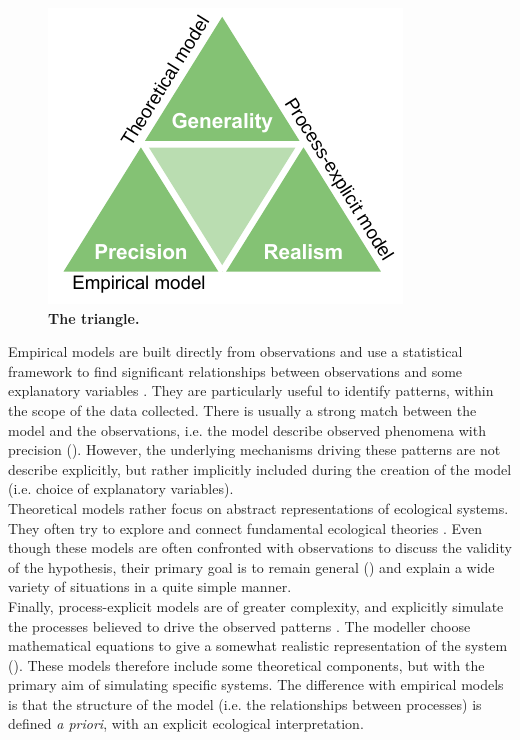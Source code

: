 \clearpage

\begin{figure}[ht]
\centering
\includegraphics{0introduction/figs/levins_triangle.pdf}
\caption{\textbf{The \citet{Levins1966} triangle.}}
\label{fig:levins}
\end{figure}

Empirical models are built directly from observations and use a statistical framework to find significant relationships between observations and some explanatory variables \citep{Dormann2012}. They are particularly useful to identify patterns, within the scope of the data collected. There is usually a strong match between the model and the observations, i.e. the model describe observed phenomena with precision (). However, the underlying mechanisms driving these patterns are not describe explicitly, but rather implicitly included during the creation of the model (i.e. choice of explanatory variables). \\
Theoretical models rather focus on abstract representations of ecological systems. They often try to explore and connect fundamental ecological theories \citep[][]{Chevin2010}. Even though these models are often confronted with observations to discuss the validity of the hypothesis, their primary goal is to remain general () and explain a wide variety of situations in a quite simple manner. \\
Finally, process-explicit models are of greater complexity, and explicitly simulate the processes believed to drive the observed patterns \citep{Evans2012}. The modeller choose mathematical equations to give a somewhat realistic representation of the system (). These models therefore include some theoretical components, but with the primary aim of simulating specific systems. The difference with empirical models is that the structure of the model (i.e. the relationships between processes) is defined \emph{a priori}, with an explicit ecological interpretation. 

